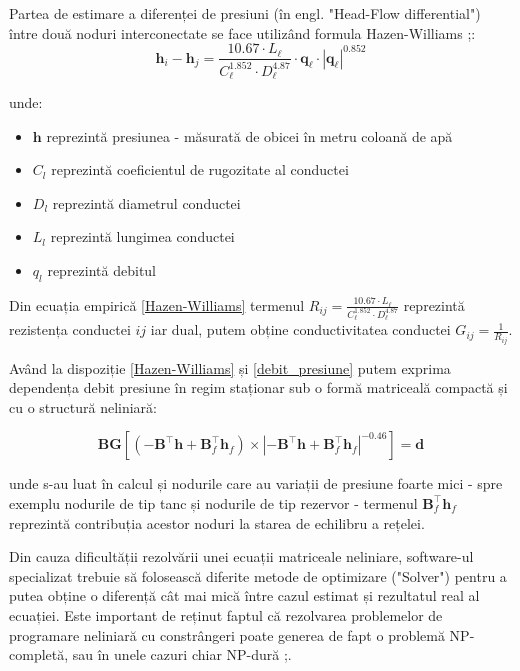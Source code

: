 Partea de estimare a diferenței de presiuni (în engl. "Head-Flow differential") între două noduri interconectate se face utilizând formula Hazen-Williams ;\cite{sanz2016demand}:
\begin{equation}
\label{debit_presiune}
\mathbf h_i-\mathbf h_j=\frac{10.67\cdot L_\ell}{C_\ell^{1.852}\cdot D_\ell^{4.87}}\cdot \mathbf q_\ell\cdot |\mathbf q_\ell|^{0.852}
\end{equation}

unde:
\begin{itemize}
\label{Hazen-Williams}
\item $\textbf{h}$ reprezintă presiunea - măsurată de obicei în metru coloană de apă
\item $C_l$  reprezintă coeficientul de rugozitate al conductei
\item $D_l$ reprezintă diametrul conductei
\item $L_l$ reprezintă lungimea conductei
\item $q_l$ reprezintă debitul
\end{itemize}

Din ecuația empirică \eqref{Hazen-Williams} termenul $R_{ij}=\frac{10.67\cdot L_\ell}{C_\ell^{1.852}\cdot D_\ell^{4.87}}$ reprezintă rezistența conductei $ij$ iar dual, putem obține conductivitatea conductei $G_{ij} = \frac{1}{R_{ij}}$.

Având la dispoziție \eqref{Hazen-Williams} și \eqref{debit_presiune} putem exprima dependența debit presiune în regim staționar sub o formă matriceală compactă și cu o structură neliniară:

\begin{equation}
\label{eq:HW-matrix}
\mathbf B\mathbf G\left[\left(-\mathbf B^\top \mathbf h+\mathbf B_f^\top \mathbf h_f\right)\times \left|-\mathbf B^\top \mathbf h+\mathbf B_f^\top \mathbf h_f\right|^{-0.46}\right]=\mathbf d
\end{equation}

unde s-au luat în calcul și nodurile care au variații de presiune foarte mici - spre exemplu nodurile de tip tanc și  nodurile de tip rezervor - termenul $\mathbf B_f^\top \mathbf h_f$ reprezintă contribuția acestor noduri la starea de echilibru a rețelei.

Din cauza dificultății rezolvării unei ecuații matriceale neliniare, software-ul specializat trebuie să folosească diferite metode de optimizare ("Solver") pentru a putea obține o diferență cât mai mică între cazul estimat și rezultatul real al ecuației. Este important de reținut faptul că rezolvarea problemelor de programare neliniară cu constrângeri poate generea de fapt o problemă NP-completă, sau în unele cazuri chiar NP-dură ;\cite{karp1975computational}.

